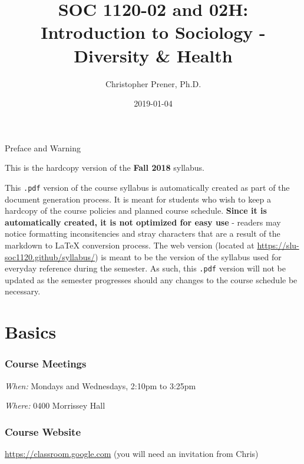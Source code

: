 \documentclass[]{book}
\title{SOC 1120-02 and 02H: Introduction to Sociology - Diversity \& Health}
\author{Christopher Prener, Ph.D.}
\date{2019-01-04}
\begin{document}
\maketitle

\begin{center}
{\huge Preface and Warning} \\
\end{center}
\vspace{5mm}
This is the hardcopy version of the \textbf{Fall 2018} syllabus.
\vspace{5mm}
\par \noindent This \texttt{.pdf} version of the course syllabus is automatically created as part of the document generation process. It is meant for students who wish to keep a hardcopy of the course policies and planned course schedule. \textbf{Since it is automatically created, it is not optimized for easy use} - readers may notice formatting inconsitencies and stray characters that are a result of the markdown to \LaTeX{} conversion process. The web version (located at \href{https://slu-soc1120.github/syllabus/}{https://slu-soc1120.github/syllabus/}) is meant to be the version of the syllabus used for everyday reference during the semester. As such, this \texttt{.pdf} version will not be updated as the semester progresses should any changes to the course schedule be necessary.

\hypertarget{basics}{%
\chapter*{Basics}\label{basics}}

\hypertarget{course-meetings}{%
\subsection*{Course Meetings}\label{course-meetings}}

\emph{When:} Mondays and Wednesdays, 2:10pm to 3:25pm

\emph{Where:} 0400 Morrissey Hall

\hypertarget{course-website}{%
\subsection*{Course Website}\label{course-website}}

\url{https://classroom.google.com} (you will need an invitation from Chris)
\end{document}
